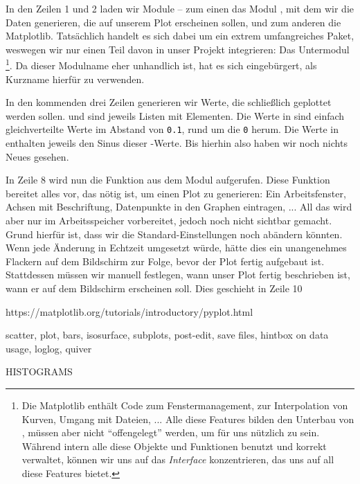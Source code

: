 In den Zeilen 1 und 2 laden wir Module -- zum einen das Modul , mit dem wir die Daten generieren, die auf unserem Plot erscheinen sollen, und zum anderen die Matplotlib. Tatsächlich handelt es sich dabei um ein extrem umfangreiches Paket, weswegen wir nur einen Teil davon in unser Projekt integrieren: Das Untermodul \footnote{Die Matplotlib enthält Code zum Fenstermanagement, zur Interpolation von Kurven, Umgang mit Dateien, ... Alle diese Features bilden den Unterbau von , müssen aber nicht \enquote{offengelegt} werden, um für uns nützlich zu sein. Während  intern alle diese Objekte und Funktionen benutzt und korrekt verwaltet, können wir uns auf das \emph{Interface} konzentrieren, das uns  auf all diese Features bietet.}. Da dieser Modulname  eher unhandlich ist, hat es sich eingebürgert,  als Kurzname hierfür zu verwenden.

In den kommenden drei Zeilen generieren wir Werte, die schließlich geplottet werden sollen.  und  sind jeweils Listen mit  Elementen. Die Werte in  sind einfach gleichverteilte Werte im Abstand von \texttt{0.1}, rund um die \texttt{0} herum. Die Werte in  enthalten jeweils den Sinus dieser -Werte. Bis hierhin also haben wir noch nichts Neues gesehen.

In Zeile 8 wird nun die Funktion  aus dem Modul  aufgerufen. Diese Funktion bereitet alles vor, das nötig ist, um einen Plot zu generieren: Ein Arbeitsfenster, Achsen mit Beschriftung, Datenpunkte in den Graphen eintragen, ... All das wird aber nur im Arbeitsspeicher vorbereitet, jedoch noch nicht sichtbar gemacht. Grund hierfür ist, dass wir die Standard-Einstellungen noch abändern könnten. Wenn jede Änderung in Echtzeit umgesetzt würde, hätte dies ein unangenehmes Flackern auf dem Bildschirm zur Folge, bevor der Plot fertig aufgebaut ist. Stattdessen müssen wir manuell festlegen, wann unser Plot fertig beschrieben ist, \ie wann er auf dem Bildschirm erscheinen soll. Dies geschieht in Zeile 10

https://matplotlib.org/tutorials/introductory/pyplot.html




scatter, plot, bars, isosurface, subplots, post-edit, save files, hintbox on data usage, loglog, quiver

HISTOGRAMS